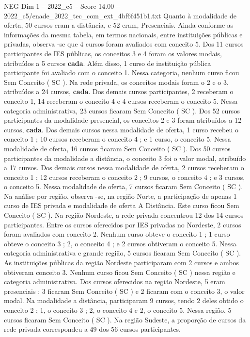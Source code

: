 \begin{textsample}{NEG Dim 1 – 2022\_c5 – Score 14.00 – 2022\_c5/enade\_2022\_tec\_com\_ext\_4bf6f451b1.txt}
Quanto à modalidade de oferta, 50 cursos eram a distância, e 52 eram, Presenciais.
Ainda conforme as informações da mesma tabela, em termos nacionais, entre instituições públicas e privadas, observa -se que 4 cursos foram avaliados com conceito 5.
Dos 11 cursos participantes de IES públicas, os conceitos 3 e 4 foram os valores modais, atribuídos a 5 cursos \textbf{cada}.
Além disso, 1 curso de instituição pública participante foi avaliado com o conceito 1.
Nessa categoria, nenhum curso ficou Sem Conceito ( SC ).
Na rede privada, os conceitos modais foram o 2 e o 3, atribuídos a 24 cursos, \textbf{cada}.
Dos demais cursos participantes, 2 receberam o conceito 1, 14 receberam o conceito 4 e 4 cursos receberam o conceito 5.
Nessa categoria administrativa, 23 cursos ficaram Sem Conceito ( SC ).
Dos 52 cursos participantes da modalidade presencial, os conceitos 2 e 3 foram atribuídos a 12 cursos, \textbf{cada}.
Dos demais cursos nessa modalidade de oferta, 1 curso recebeu o conceito 1 ; 10 cursos receberam o conceito 4 ; e 1 curso, o conceito 5.
Nessa modalidade de oferta, 16 cursos ficaram Sem Conceito ( SC ).
Dos 50 cursos participantes da modalidade a distância, o conceito 3 foi o valor modal, atribuído a 17 cursos.
Dos demais cursos nessa modalidade de oferta, 2 cursos receberam o conceito 1 ; 12 cursos receberam o conceito 2 ; 9 cursos, o conceito 4 ; e 3 cursos, o conceito 5.
Nessa modalidade de oferta, 7 cursos ficaram Sem Conceito ( SC ).
Na análise por região, observa -se, na região Norte, a participação de apenas 1 curso de IES privada e modalidade de oferta A Distância.
Este curso ficou Sem Conceito ( SC ).
Na região Nordeste, a rede privada concentrou 12 dos 14 cursos participantes.
Entre os cursos oferecidos por IES privadas no Nordeste, 2 cursos foram avaliados com conceito 2.
Nenhum curso obteve o conceito 1 ; 1 curso obteve o conceito 3 ; 2, o conceito 4 ; e 2 cursos obtiveram o conceito 5.
Nessa categoria administrativa e grande região, 5 cursos ficaram Sem Conceito ( SC ).
As instituições públicas da região Nordeste participaram com 2 cursos e ambos obtiveram conceito 3.
Nenhum curso ficou Sem Conceito ( SC ) nessa região e categoria administrativa.
Dos cursos oferecidos na região Nordeste, 5 eram presenciais ; 3 ficaram Sem Conceito ( SC ) e 2 ficaram com o conceito 3, o valor modal.
Na modalidade a distância, participaram 9 cursos, tendo 2 deles obtido o conceito 2 ; 1, o conceito 3 ; 2, o conceito 4 e 2, o conceito 5.
Nessa região, 5 cursos ficaram Sem Conceito ( SC ).
Na região Sudeste, a proporção de cursos da rede privada correspondeu a 49 dos 56 cursos participantes.

\end{textsample}
